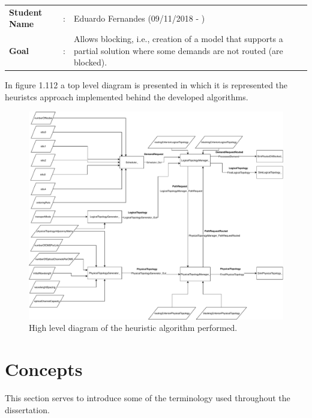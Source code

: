 \begin{tcolorbox}	
	\begin{tabular}{p{2.75cm} p{0.2cm} p{10.5cm}} 	
		\textbf{Student Name}   &:& Eduardo Fernandes    (09/11/2018 - )\\
		\textbf{Goal}           &:& Allows blocking, i.e., creation of a model that supports a partial solution where some demands are not routed (are blocked).
	\end{tabular}
\end{tcolorbox}

 \vspace{11pt}
 In figure 1.112 a top level diagram is presented in which it is represented the heuristcs approach implemented behind the developed algorithms. %

\begin{figure}[H]
	\centering
	\includegraphics[width=15cm]{sdf/heuristic/transparent/figures/novoFluxograma}
	\caption{High level diagram of the heuristic algorithm performed.}
	\label{fluxogram_transparent_surv}
\end{figure}

\section{Concepts}
This section serves to introduce some of the terminology used throughout the dissertation.
